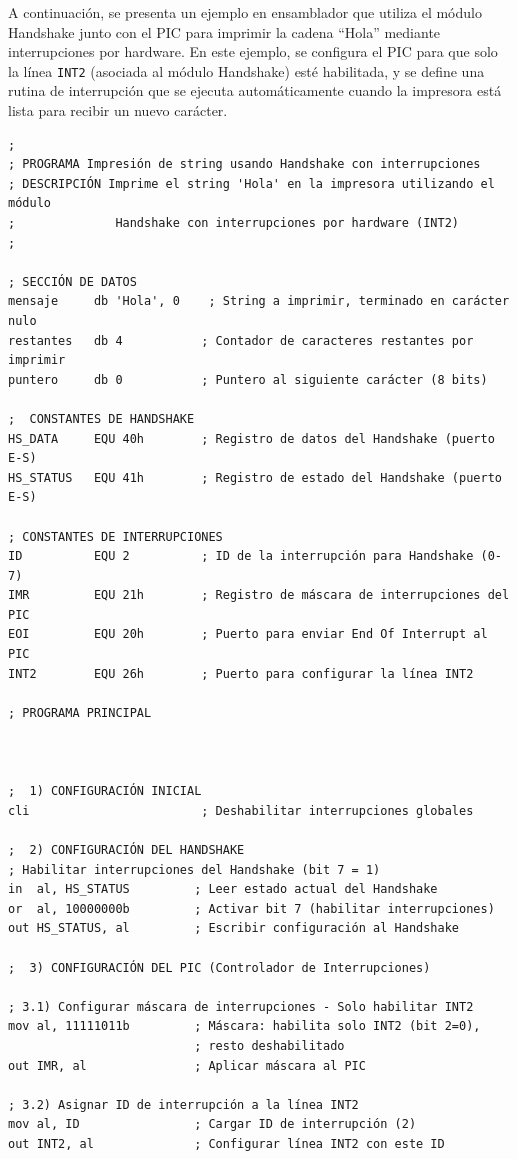 \documentclass[12pt,oneside]{templates/unerthesis}
\begin{document}
A continuación, se presenta un ejemplo en ensamblador que utiliza el módulo Handshake junto con el PIC para imprimir la cadena ``Hola'' mediante interrupciones por hardware. En este ejemplo, se configura el PIC para que solo la línea \texttt{INT2} (asociada al módulo Handshake) esté habilitada, y se define una rutina de interrupción que se ejecuta automáticamente cuando la impresora está lista para recibir un nuevo carácter.

\begin{lstlisting}
; 
; PROGRAMA Impresión de string usando Handshake con interrupciones
; DESCRIPCIÓN Imprime el string 'Hola' en la impresora utilizando el módulo
;              Handshake con interrupciones por hardware (INT2)
; 

; SECCIÓN DE DATOS 
mensaje     db 'Hola', 0    ; String a imprimir, terminado en carácter nulo
restantes   db 4           ; Contador de caracteres restantes por imprimir
puntero     db 0           ; Puntero al siguiente carácter (8 bits)

;  CONSTANTES DE HANDSHAKE 
HS_DATA     EQU 40h        ; Registro de datos del Handshake (puerto E-S)
HS_STATUS   EQU 41h        ; Registro de estado del Handshake (puerto E-S)

; CONSTANTES DE INTERRUPCIONES 
ID          EQU 2          ; ID de la interrupción para Handshake (0-7)
IMR         EQU 21h        ; Registro de máscara de interrupciones del PIC
EOI         EQU 20h        ; Puerto para enviar End Of Interrupt al PIC
INT2        EQU 26h        ; Puerto para configurar la línea INT2

; PROGRAMA PRINCIPAL



;  1) CONFIGURACIÓN INICIAL 
cli                        ; Deshabilitar interrupciones globales

;  2) CONFIGURACIÓN DEL HANDSHAKE
; Habilitar interrupciones del Handshake (bit 7 = 1)
in  al, HS_STATUS         ; Leer estado actual del Handshake
or  al, 10000000b         ; Activar bit 7 (habilitar interrupciones)
out HS_STATUS, al         ; Escribir configuración al Handshake

;  3) CONFIGURACIÓN DEL PIC (Controlador de Interrupciones)

; 3.1) Configurar máscara de interrupciones - Solo habilitar INT2
mov al, 11111011b         ; Máscara: habilita solo INT2 (bit 2=0),
                          ; resto deshabilitado
out IMR, al               ; Aplicar máscara al PIC

; 3.2) Asignar ID de interrupción a la línea INT2
mov al, ID                ; Cargar ID de interrupción (2)
out INT2, al              ; Configurar línea INT2 con este ID


\end{lstlisting}
\end{document}
